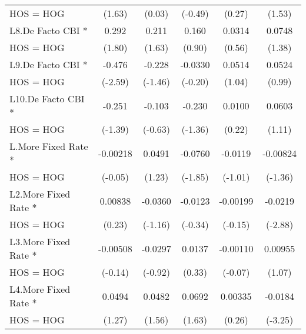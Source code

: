 {\begin{tabular}{l*{5}{c}}
HOS = HOG           &      (1.63)         &      (0.03)         &     (-0.49)         &      (0.27)         &      (1.53)         \\
[1em]
L8.De Facto CBI *   &       0.292         &       0.211         &       0.160         &      0.0314         &      0.0748         \\
HOS = HOG           &      (1.80)         &      (1.63)         &      (0.90)         &      (0.56)         &      (1.38)         \\
[1em]
L9.De Facto CBI *   &      -0.476\sym{*}  &      -0.228         &     -0.0330         &      0.0514         &      0.0524         \\
HOS = HOG           &     (-2.59)         &     (-1.46)         &     (-0.20)         &      (1.04)         &      (0.99)         \\
[1em]
L10.De Facto CBI *  &      -0.251         &      -0.103         &      -0.230         &      0.0100         &      0.0603         \\
HOS = HOG           &     (-1.39)         &     (-0.63)         &     (-1.36)         &      (0.22)         &      (1.11)         \\
[1em]
L.More Fixed Rate * &    -0.00218         &      0.0491         &     -0.0760         &     -0.0119         &    -0.00824         \\
HOS = HOG           &     (-0.05)         &      (1.23)         &     (-1.85)         &     (-1.01)         &     (-1.36)         \\
[1em]
L2.More Fixed Rate *&     0.00838         &     -0.0360         &     -0.0123         &    -0.00199         &     -0.0219\sym{**} \\
HOS = HOG           &      (0.23)         &     (-1.16)         &     (-0.34)         &     (-0.15)         &     (-2.88)         \\
[1em]
L3.More Fixed Rate *&    -0.00508         &     -0.0297         &      0.0137         &    -0.00110         &     0.00955         \\
HOS = HOG           &     (-0.14)         &     (-0.92)         &      (0.33)         &     (-0.07)         &      (1.07)         \\
[1em]
L4.More Fixed Rate *&      0.0494         &      0.0482         &      0.0692         &     0.00335         &     -0.0184\sym{**} \\
HOS = HOG           &      (1.27)         &      (1.56)         &      (1.63)         &      (0.26)         &     (-3.25)         \\

\end{tabular}}

